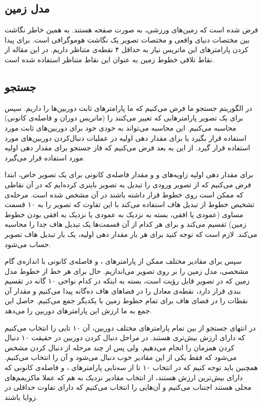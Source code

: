 \documentclass{report}
\begin{document}
\subsection{مدل زمین}
فرض شده است که زمین‌های ورزشی، به صورت صفحه هستند. به همین خاطر نگاشت بین مختصات دنیای واقعی و مختصات تصویر یک نگاشت هوموگرافی است. برای پیدا کردن پارامترهای این ماتریس نیاز به حداقل ۴ نقطه‌ی متناظر داریم. در این مقاله از نقاط تلاقی خطوط زمین به عنوان این نقاط متناظر استفاده شده است.
\subsection{جستجو}
در الگوریتم جستجو ما فرض می‌کنیم که ما پارامترهای ثابت دوربین‌ها را داریم. سپس برای یک تصویر پارامترهایی که تغییر می‌کنند را (ماتریس دوران و فاصله‌ی کانونی) محاسبه می‌کنیم. این محاسبه می‌تواند به خودی خود برای دوربین‌های ثابت مورد استفاده قرار بگیرد یا برای مقدار دهی اولیه در عملیات دنبال‌کردن دوربین‌های مورد استفاده قرار گیرد. از این به بعد فرض می‌کنیم که فاز جستجو برای مقدار دهی اولیه مورد استفاده قرار می‌گیرد.

برای مقدار دهی اولیه زاویه‌های  و  و مقدار فاصله‌ی کانونی برای یک تصویر خاص، ابتدا فرض می‌کنیم که از تصویر ورودی را تبدیل به تصویر باینری کرده‌ایم که در آن نقاطی که ممکن است روی خطوط قرار داشته باشند در آن مشخص شده است. مرحله‌ی تشخیص خطوط از تبدیل هاف استفاده می‌کند با این تفاوت که تصویر را به ۱۰ قسمت مساوی (عمودی یا افقی، بسته به نزدیک به عمودی یا نزدیک به افقی بودن خطوط زمین) تقسیم می‌کند و برای هر کدام از آن قسمت‌ها یک تبدیل هاف جدا را محاسبه می‌کند. لازم است که توجه کنید برای هر بار مقدار دهی اولیه، یک بار تبدیل هاف تصویر حساب می‌شود.

سپس برای مقادیر مختلف ممکن از پارامترهای ،  و فاصله‌ی کانونی با اندازه‌ی گام مشخصی، مدل زمین را بر روی تصویر می‌اندازیم. حال برای هر خط از خطوط مدل زمین که در تصویر قابل رؤیت است، بسته به اینکه در کدام نواحی ۱۰ گانه در تقسیم بندی قرار دارد، نقطه‌ی معادل را در فضاهای هاف ده‌گانه پیدا می‌کنیم و مقدار آن نقطات را در فضای هاف برای تمام خطوط زمین با یکدیگر جمع می‌کنیم. حاصل این جمع به ما ارزش این پارامترهای دوربین را می‌دهد.

در انتهای جستجو از بین تمام پارامترهای مختلف دوربین، آن ۱۰ تایی را انتخاب می‌کنیم که دارای ارزش بیش‌تری هستند. در مراحل دنبال کردن دوربین در حقیقت ۱۰ دنبال کردن همزمان را انجام می‌دهیم. ولی پس از چند مرحله از دنبال کردن مشخص می‌شود که فقط یکی از این مقادیر خوب دنبال می‌شود و آن را انتخاب می‌کنیم. همچنین باید توجه کنیم که در انتخاب ۱۰ تا از سه‌تایی پارامترهای ،  و فاصله‌ی کانونی که دارای بیش‌ترین ارزش هستند، از انتخاب مقادیر نزدیک به هم که عملا ماکزیمم‌های محلی هستند اجتناب می‌کنیم و آن‌هایی را انتخاب می‌کنیم که دارای تفاوت حداقلی در زوایا باشند.
\end{document}
